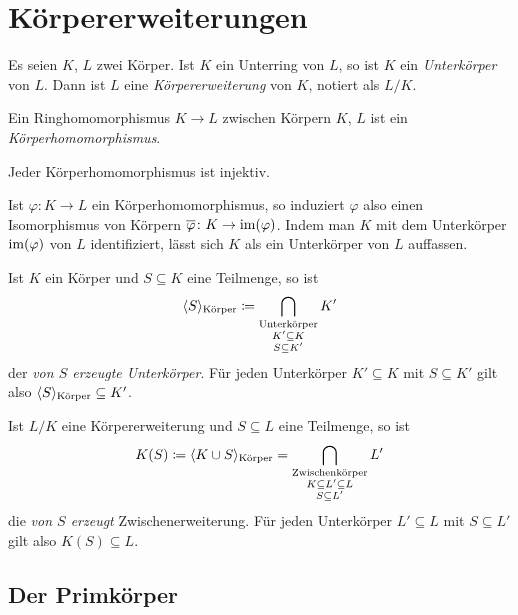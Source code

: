 \chapter{Körpererweiterungen}

\begin{definition}
  Es seien $K$, $L$ zwei Körper.
  Ist $K$ ein Unterring von $L$, so ist $K$ ein \emph{Unterkörper} von $L$.
  Dann ist $L$ eine \emph{Körpererweiterung} von $K$, notiert als $L/K$.
\end{definition}

\begin{definition}
  Ein Ringhomomorphismus $K \to L$ zwischen Körpern $K$, $L$ ist ein \emph{Körperhomomorphismus}.
\end{definition}

\begin{lemma}
  Jeder Körperhomomorphismus ist injektiv.
\end{lemma}

Ist $\varphi \colon K \to L$ ein Körperhomomorphismus, so induziert $\varphi$ also einen Isomorphismus von Körpern $\overline{\varphi} \colon  K \to \operatorname{im}(\varphi)$.
Indem man $K$ mit dem Unterkörper $\operatorname{im}(\varphi)$ von $L$ identifiziert, lässt sich $K$ als ein Unterkörper von $L$ auffassen.

\begin{definition}
  Ist $K$ ein Körper und $S \subseteq K$ eine Teilmenge, so ist
  \[
              \langle S\rangle_{\text{Körper}}
    \coloneqq  \bigcap_{\substack{\text{Unterkörper} \\ K' \subseteq K \\S \subseteq K'}} K'
  \]
  der \emph{von $S$ erzeugte Unterkörper}.
  Für jeden Unterkörper $K' \subseteq K$ mit $S \subseteq K'$ gilt also $\langle S\rangle_{\text{Körper}} \subseteq K'$.

  Ist $L/K$ eine Körpererweiterung und $S \subseteq L$ eine Teilmenge, so ist
  \[
              K(S)
    \coloneqq  \langle K \cup S\rangle_{\text{Körper}}
    =         \bigcap_{\substack{\text{Zwischenkörper} \\ K \subseteq L' \subseteq L \\ S \subseteq L'}} L'
  \]
  die \emph{von $S$ erzeugt} Zwischenerweiterung.
  Für jeden Unterkörper $L' \subseteq L$ mit $S \subseteq L'$ gilt also $K(S) \subseteq L$.
\end{definition}





\section{Der Primkörper}


